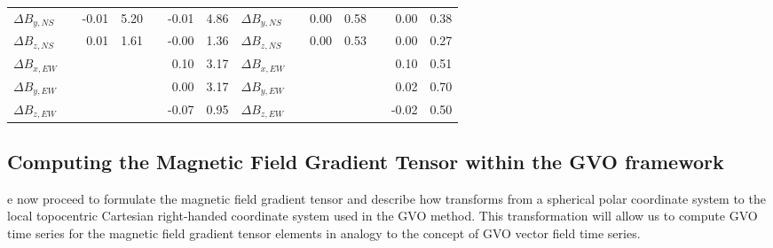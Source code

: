 \documentclass[extra,mreferee]{gji}
\begin{document}
\begin{table}
{\begin{tabular}{l r r r r r r | l r r r r r r}
 $\Delta B_{y,NS}$ &      & -0.01 & 5.20 &      & -0.01  & 4.86   & $\Delta B_{y,NS}$ &      & 0.00  & 0.58 &      & 0.00   & 0.38\\
 $\Delta B_{z,NS}$ &      & 0.01  & 1.61 &      & -0.00  & 1.36   & $\Delta B_{z,NS}$ &      & 0.00  & 0.53 &      & 0.00   & 0.27\\
 $\Delta B_{x,EW}$ &      &       &      &      & 0.10   & 3.17   & $\Delta B_{x,EW}$ &      &       &      &      & 0.10    & 0.51\\
 $\Delta B_{y,EW}$ &      &       &      &      & 0.00   & 3.17   & $\Delta B_{y,EW}$ &      &       &      &      & 0.02  & 0.70\\
 $\Delta B_{z,EW}$ &      &       &      &      & -0.07  & 0.95   & $\Delta B_{z,EW}$ &      &       &      &      & -0.02  & 0.50\\ 
\bottomrule                
\end{tabular}
\label{table.1}}
\end{table}

\subsection{Computing the Magnetic Field Gradient Tensor within the GVO framework}
\label{sec:4.2}
e now proceed to formulate the magnetic field gradient tensor and describe how  transforms from a spherical polar coordinate system to the local topocentric Cartesian right-handed coordinate system used in the GVO method. This transformation will allow us to compute GVO time series for the magnetic field gradient tensor elements in analogy to the concept of GVO vector field time series. 
\end{document}

